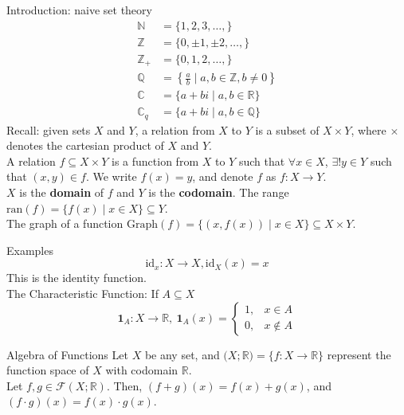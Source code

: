 \documentclass[8pt]{extarticle}
\title{}
\author{Avinash Iyer}
\date{}
\begin{document}
  \begin{problem}{Introduction: naive set theory}
    \begin{align*}
      \mathbb{N} &= \{1,2,3,\dots,\}\\
      \mathbb{Z} &= \{0,\pm1,\pm2,\dots,\} \\
      \mathbb{Z}_+ &= \{0,1,2,\dots,\}\\
      \mathbb{Q} &= \left\{\frac{a}{b} \mid a,b\in\mathbb{Z},b\neq 0\right\}\\
      \mathbb{C} &= \{a+bi \mid a,b\in \mathbb{R}\}\\
      \mathbb{C}_q &= \{a+bi \mid a,b\in \mathbb{Q}\}
    \end{align*}
    Recall: given sets $X$ and $Y$, a relation from $X$ to $Y$ is a subset of $X\times Y$, where $\times$ denotes the cartesian product of $X$ and $Y$.\\

    A relation $f\subseteq X\times Y$ is a function from $X$ to $Y$ such that $\forall x\in X$, $\exists!y\in Y$ such that $(x,y) \in f$. We write $f(x) = y$, and denote $f$ as $f:X\rightarrow Y$.\\

    $X$ is the \textbf{domain} of $f$ and $Y$ is the \textbf{codomain}. The range $\textrm{ran}(f) = \{f(x)\mid x\in X\}\subseteq Y$. \\

    The graph of a function $\textrm{Graph}(f) = \{(x,f(x))\mid x\in X\} \subseteq X\times Y$.
    \begin{problem}{Examples}
      \[\textrm{id}_x: X\rightarrow X, \textrm{id}_X(x) = x\]
      This is the identity function.\\

      The Characteristic Function: If $A\subseteq X$
      \[\mathbf{1}_A: X\rightarrow \mathbb{R}, ~\mathbf{1}_A(x) = \begin{cases}
        1,&x\in A\\
        0,&x\notin A
      \end{cases}\]
    \end{problem}
    \begin{problem}{Algebra of Functions}
      Let $X$ be any set, and $\mathcal(X;\mathbb{R}) = \{f:X\rightarrow \mathbb{R}\}$ represent the function space of $X$ with codomain $\mathbb{R}$.\\

      Let $f,g\in \mathcal{F}(X;\mathbb{R})$. Then, $(f+g)(x) = f(x) + g(x)$, and $(f\cdot g)(x) = f(x)\cdot g(x)$.\\


\end{problem}
\end{problem}
\end{document}
